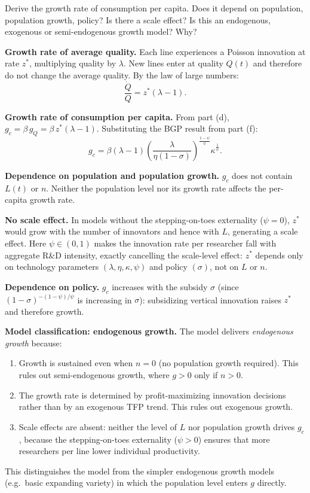 \documentclass[11pt]{exam}
\begin{document}
\begin{questions}
\question Derive the growth rate of consumption per capita. Does it depend on population, population growth, policy? Is there a scale effect? Is this an endogenous, exogenous or semi-endogenous growth model? Why?
\begin{solution}
\textbf{Growth rate of average quality.}  Each line experiences a Poisson innovation at rate $z^{*}$, multiplying quality by $\lambda$.  New lines enter at quality $Q(t)$ and therefore do not change the average quality.  By the law of large numbers:
\[
	\frac{\dot{Q}}{Q} = z^{*}(\lambda-1).
\]

\textbf{Growth rate of consumption per capita.}  From part (d), $g_{c}=\beta\,g_{Q}=\beta\,z^{*}(\lambda-1)$.  Substituting the BGP result from part (f):
\[
	\boxed{g_{c} = \beta(\lambda-1)\left(\frac{\lambda}{\eta(1-\sigma)}\right)^{\!\frac{1-\psi}{\psi}}\kappa^{\frac{1}{\psi}}.}
\]

\textbf{Dependence on population and population growth.}  $g_{c}$ does not contain $L(t)$ or $n$.  Neither the population level nor its growth rate affects the per-capita growth rate.

\textbf{No scale effect.}  In models without the stepping-on-toes externality ($\psi=0$), $z^{*}$ would grow with the number of innovators and hence with $L$, generating a scale effect.  Here $\psi\in(0,1)$ makes the innovation rate per researcher fall with aggregate R\&D intensity, exactly cancelling the scale-level effect: $z^{*}$ depends only on technology parameters $(\lambda,\eta,\kappa,\psi)$ and policy $(\sigma)$, not on $L$ or $n$.

\textbf{Dependence on policy.}  $g_{c}$ increases with the subsidy $\sigma$ (since $(1-\sigma)^{-(1-\psi)/\psi}$ is increasing in $\sigma$): subsidizing vertical innovation raises $z^{*}$ and therefore growth.

\textbf{Model classification: endogenous growth.}  The model delivers \emph{endogenous growth} because:
\begin{enumerate}
	\item Growth is sustained even when $n=0$ (no population growth required).  This rules out semi-endogenous growth, where $g>0$ only if $n>0$.
	\item The growth rate is determined by profit-maximizing innovation decisions rather than by an exogenous TFP trend.  This rules out exogenous growth.
	\item Scale effects are absent: neither the level of $L$ nor population growth drives $g_{c}$, because the stepping-on-toes externality ($\psi>0$) ensures that more researchers per line lower individual productivity.
\end{enumerate}
This distinguishes the model from the simpler endogenous growth models (e.g.\ basic expanding variety) in which the population level enters $g$ directly.
\end{solution}


\end{questions}
\end{document}
